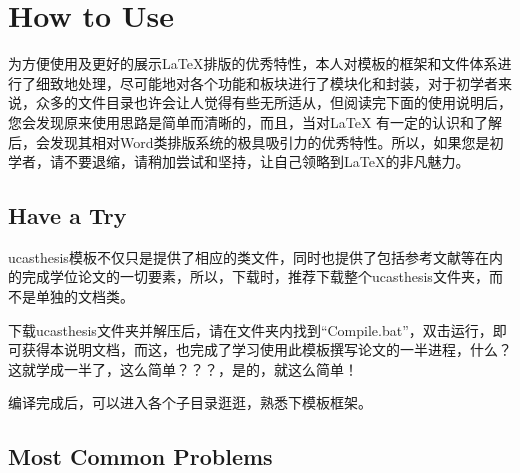 
\chapter{How to Use}
\label{chap:guide}

为方便使用及更好的展示\LaTeX{}排版的优秀特性，本人对模板的框架和文件体系进行了细致地处理，尽可能地对各个功能和板块进行了模块化和封装，对于初学者来说，众多的文件目录也许会让人觉得有些无所适从，但阅读完下面的使用说明后，您会发现原来使用思路是简单而清晰的，而且，当对\LaTeX{} 有一定的认识和了解后，会发现其相对Word类排版系统的极具吸引力的优秀特性。所以，如果您是初学者，请不要退缩，请稍加尝试和坚持，让自己领略到\LaTeX{}的非凡魅力。

\section{Have a Try}

ucasthesis模板不仅只是提供了相应的类文件，同时也提供了包括参考文献等在内的完成学位论文的一切要素，所以，下载时，推荐下载整个ucasthesis文件夹，而不是单独的文档类。

下载ucasthesis文件夹并解压后，请在文件夹内找到“Compile.bat”，双击运行，即可获得本说明文档，而这，也完成了学习使用此模板撰写论文的一半进程，什么？这就学成一半了，这么简单？？？，是的，就这么简单！

编译完成后，可以进入各个子目录逛逛，熟悉下模板框架。

\section{Most Common Problems}

